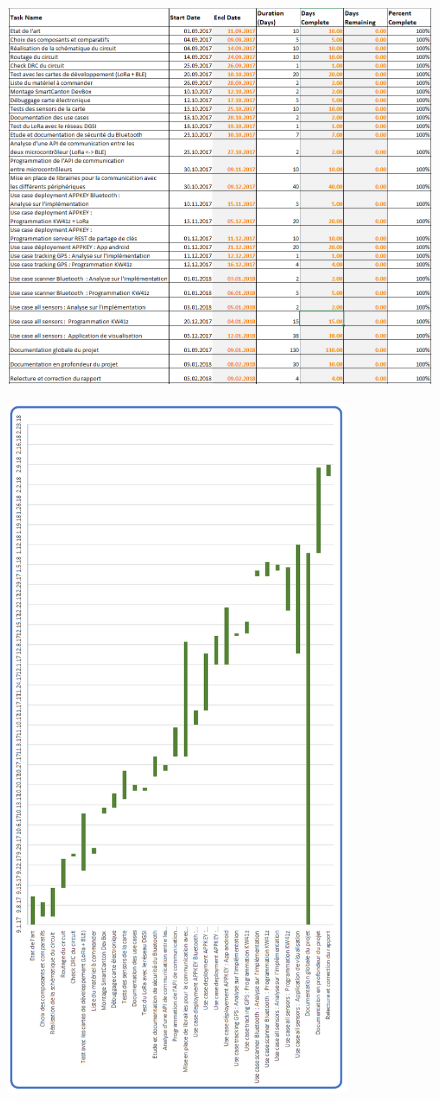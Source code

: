 \begin{figure}[ht!]
    \centering
    \includegraphics[width=1.0\textwidth]{Figures/Appendixes/gantt_planning_real_details.png}
    \label{figapdx-gantt_planning_real_details}
\end{figure}

\begin{figure}[ht!]
    \centering
    \includegraphics[width=0.80\textwidth]{Figures/Appendixes/gantt_planning_real.png}
    \label{figapdx-gantt_planning_real}
\end{figure}
